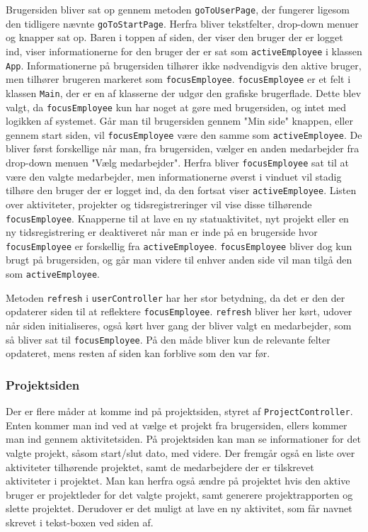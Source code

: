 Brugersiden bliver sat op gennem metoden \texttt{goToUserPage}, der fungerer ligesom den tidligere nævnte \texttt{goToStartPage}. Herfra bliver tekstfelter, drop-down menuer og knapper sat op. Baren i toppen af siden, der viser den bruger der er logget ind, viser informationerne for den bruger der er sat som \texttt{activeEmployee} i klassen \texttt{App}. Informationerne på brugersiden tilhører ikke nødvendigvis den aktive bruger, men tilhører brugeren markeret som \texttt{focusEmployee}. \texttt{focusEmployee} er et felt i klassen \texttt{Main}, der er en af klasserne der udgør den grafiske brugerflade. Dette blev valgt, da \texttt{focusEmployee} kun har noget at gøre med brugersiden, og intet med logikken af systemet. Går man til brugersiden gennem "Min side" knappen, eller gennem start siden, vil \texttt{focusEmployee} være den samme som \texttt{activeEmployee}. De bliver først forskellige når man, fra brugersiden, vælger en anden medarbejder fra drop-down menuen "Vælg medarbejder". Herfra bliver \texttt{focusEmployee} sat til at være den valgte medarbejder, men informationerne øverst i vinduet vil stadig tilhøre den bruger der er logget ind, da den fortsat viser \texttt{activeEmployee}. Listen over aktiviteter, projekter og tidsregistreringer vil vise disse tilhørende \texttt{focusEmployee}. Knapperne til at lave en ny statuaktivitet, nyt projekt eller en ny tidsregistrering er deaktiveret når man er inde på en brugerside hvor \texttt{focusEmployee} er forskellig fra \texttt{activeEmployee}. \texttt{focusEmployee} bliver dog kun brugt på brugersiden, og går man videre til enhver anden side vil man tilgå den som \texttt{activeEmployee}.

Metoden \texttt{refresh} i \texttt{userController} har her stor betydning, da det er den der opdaterer siden til at reflektere \texttt{focusEmployee}. \texttt{refresh} bliver her kørt, udover når siden initialiseres, også kørt hver gang der bliver valgt en medarbejder, som så bliver sat til \texttt{focusEmployee}. På den måde bliver kun de relevante felter opdateret, mens resten af siden kan forblive som den var før. 


\subsubsection{Projektsiden}
Der er flere måder at komme ind på projektsiden, styret af \texttt{ProjectController}. Enten kommer man ind ved at vælge et projekt fra brugersiden, ellers kommer man ind gennem aktivitetsiden. På projektsiden kan man se informationer for det valgte projekt, såsom start/slut dato, med videre. Der fremgår også en liste over aktiviteter tilhørende projektet, samt de medarbejdere der er tilskrevet aktiviteter i projektet. Man kan herfra også ændre på projektet hvis den aktive bruger er projektleder for det valgte projekt, samt generere projektrapporten og slette projektet. Derudover er det muligt at lave en ny aktivitet, som får navnet skrevet i tekst-boxen ved siden af. 

